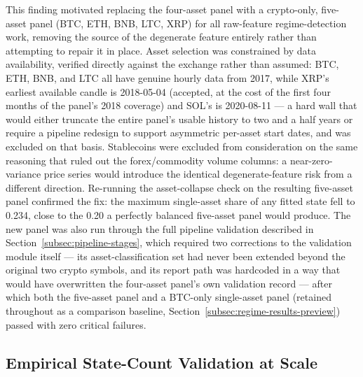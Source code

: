 This finding motivated replacing the four-asset panel with a crypto-only, five-asset panel (BTC, ETH, BNB, LTC, XRP) for all raw-feature regime-detection work, removing the source of the degenerate feature entirely rather than attempting to repair it in place. Asset selection was constrained by data availability, verified directly against the exchange rather than assumed: BTC, ETH, BNB, and LTC all have genuine hourly data from 2017, while XRP's earliest available candle is 2018-05-04 (accepted, at the cost of the first four months of the panel's 2018 coverage) and SOL's is 2020-08-11 --- a hard wall that would either truncate the entire panel's usable history to two and a half years or require a pipeline redesign to support asymmetric per-asset start dates, and was excluded on that basis. Stablecoins were excluded from consideration on the same reasoning that ruled out the forex/commodity volume columns: a near-zero-variance price series would introduce the identical degenerate-feature risk from a different direction. Re-running the asset-collapse check on the resulting five-asset panel confirmed the fix: the maximum single-asset share of any fitted state fell to 0.234, close to the 0.20 a perfectly balanced five-asset panel would produce. The new panel was also run through the full pipeline validation described in Section~\ref{subsec:pipeline-stages}, which required two corrections to the validation module itself --- its asset-classification set had never been extended beyond the original two crypto symbols, and its report path was hardcoded in a way that would have overwritten the four-asset panel's own validation record --- after which both the five-asset panel and a BTC-only single-asset panel (retained throughout as a comparison baseline, Section~\ref{subsec:regime-results-preview}) passed with zero critical failures.

\subsection{Empirical State-Count Validation at Scale}
\label{subsec:regime-nstates-revalidation}

